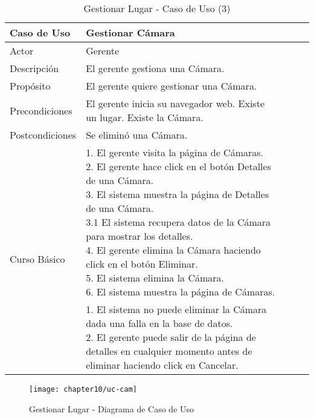 \begin{table}[H]
    \begin{tabular}{@{} *5l @{}} \toprule
    \textbf{Caso de Uso} & Gestionar Cámara \\ \midrule
    Actor & Gerente \\ 
    Descripción & El gerente gestiona una Cámara. \\ 
    Propósito & El gerente quiere gestionar una Cámara. \\ \midrule
    Precondiciones & El gerente inicia su navegador web. Existe un lugar. Existe la Cámara.\\ \midrule
    Postcondiciones & Se eliminó una Cámara. \\ \midrule
    \multirow{4}{*}{Curso Básico}
        & \parbox{0.75\linewidth}{ 
                1. El gerente visita la página de Cámaras. \\
                2. El gerente hace click en el botón Detalles de una Cámara. \\
                3. El sistema muestra la página de Detalles de una Cámara. \\
                    3.1 El sistema recupera datos de  la Cámara para mostrar los detalles. \\
                4. El gerente elimina la Cámara haciendo click en el botón Eliminar. \\
                5. El sistema elimina la Cámara.  \\
                6. El sistema muestra la página de Cámaras.   
        } \\ \midrule
        & \parbox{0.75\linewidth}{ 
            1. El sistema no puede eliminar la Cámara dada una falla en la base de datos. \\
            2. El gerente puede salir de la página de detalles en cualquier momento antes de eliminar haciendo click en Cancelar.
        }  \\  \bottomrule
     \hline
    \end{tabular}
        \caption{Gestionar Lugar - Caso de Uso (3)}
        \label{tab:tabcu-cam3}
\end{table}
    
    
    \begin{figure}[H]
        \centering
        \texttt{[image: chapter10/uc-cam]}
        \caption{Gestionar Lugar - Diagrama de Caso de Uso}
        \label{fig:uc-cam}
    \end{figure}
    

